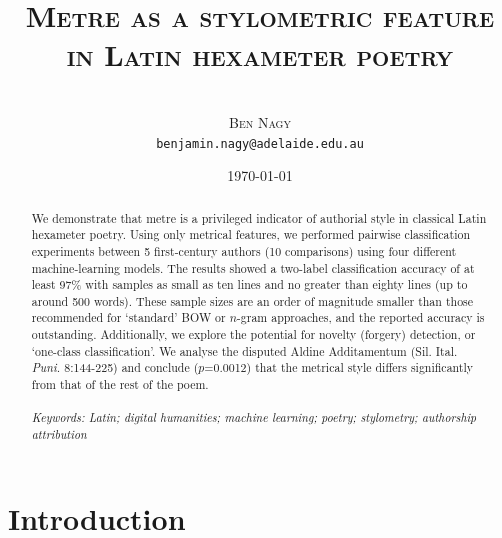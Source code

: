 \documentclass[11pt,a4paper]{scrartcl} %
\begin{document}
\title{\rmfamily\normalfont\textsc{Metre as a stylometric feature in Latin hexameter poetry}}
\author{\phantom{xxx}\\\textsc{Ben Nagy}\\\small{\texttt{benjamin.nagy@adelaide.edu.au}}}
\date{\normalsize{\today}}

\maketitle

\begin{abstract}
\noindent
We demonstrate that metre is a privileged indicator of authorial style in classical Latin hexameter poetry. Using only metrical features, we performed pairwise classification experiments between 5 first-century authors (10 comparisons) using four different machine-learning models. The results showed a two-label classification accuracy of at least 97\% with samples as small as ten lines and no greater than eighty lines (up to around 500 words). These sample sizes are an order of magnitude smaller than those recommended for `standard' BOW or $n$-gram approaches, and the reported accuracy is outstanding. Additionally, we explore the potential for novelty (forgery) detection, or `one-class classification'. We analyse the disputed Aldine Additamentum (Sil. Ital. \textit{Puni.} 8:144-225) and conclude ($p$=0.0012) that the metrical style differs significantly from that of the rest of the poem.\\
\phantom{xxx}\\
\noindent\textit{Keywords: Latin; digital humanities; machine learning; poetry; stylometry; authorship attribution}
\end{abstract}

\setlength{\parindent}{0.3in}
\section{Introduction}
\end{document}

